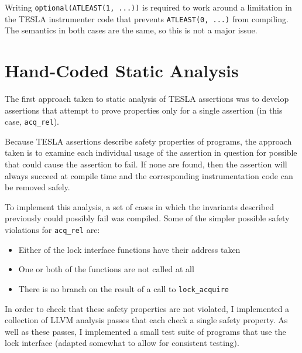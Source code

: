 Writing \texttt{optional(ATLEAST(1, ...))} is required to work around a
limitation in the TESLA instrumenter code that prevents
\texttt{ATLEAST(0, ...)} from compiling. The semantics in both cases are
the same, so this is not a major issue.

\section{Hand-Coded Static Analysis} \label{sec:hand-coded}

The first approach taken to static analysis of TESLA assertions was to develop
 assertions that attempt to prove properties only for a
single assertion (in this case, \texttt{acq_rel}).

Because TESLA assertions describe safety properties of programs, the approach
taken is to examine each individual usage of the assertion in question for
possible  that could cause the assertion to fail. If none
are found, then the assertion will always succeed at compile time and the
corresponding instrumentation code can be removed safely.

To implement this analysis, a set of cases in which the invariants described
previously could possibly fail was compiled. Some of the simpler possible safety
violations for \texttt{acq_rel} are:
\begin{itemize}
  \item Either of the lock interface functions have their address taken
  \item One or both of the functions are not called at all
  \item There is no branch on the result of a call to
  \texttt{lock_acquire}
\end{itemize}

In order to check that these safety properties are not violated, I implemented a
collection of LLVM \cite{lattner_llvm:_2002} analysis passes that each check a
single safety property. As well as these passes, I implemented a small test
suite of programs that use the lock interface (adapted somewhat to allow for
consistent testing).

